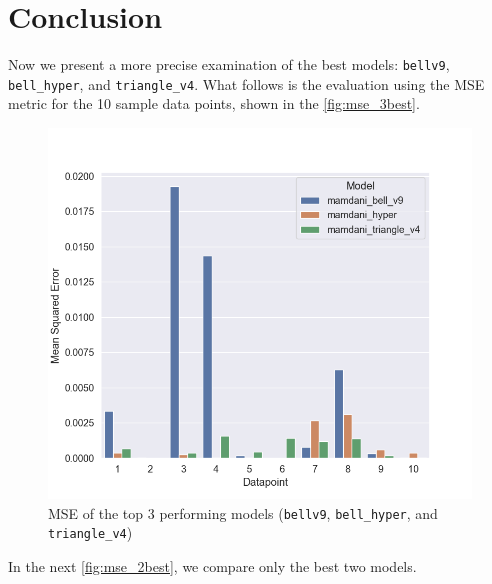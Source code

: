 \documentclass[titlepage]{article}
\begin{document}
\section{Conclusion}

Now we present a more precise examination of the best models: \texttt{bellv9}, \texttt{bell\_hyper}, and \texttt{triangle\_v4}.
What follows is the evaluation using the MSE metric for the 10 sample data points, shown in the \vref{fig:mse_3best}.

\begin{figure}[H]
\centering
\includegraphics[scale=0.4]{../images/eval_models/mse_3best}
\caption{MSE of the top 3 performing models (\texttt{bellv9}, \texttt{bell\_hyper}, and \texttt{triangle\_v4})}
\label{fig:mse_3best}
\end{figure}

In the next \cref{fig:mse_2best}, we compare only the best two models.
\end{document}
